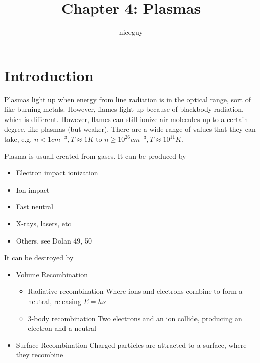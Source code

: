 \documentclass[12pt]{article}
\title{Chapter 4: Plasmas}
\author{niceguy}
\begin{document}
\maketitle

\section{Introduction}

Plasmas light up when energy from line radiation is in the optical range, sort of like burning metals. However, flames light up because of blackbody radiation, which is different. However, flames can still ionize air molecules up to a certain degree, like plasmas (but weaker). There are a wide range of values that they can take, e.g. $n < 1\unit{cm^{-3}}, T \approx 1\unit{K}$ to $n \geq 10^{26}\unit{cm^{-3}}, T \approx 10^{11}\unit{K}$.

Plasma is usuall created from gases. It can be produced by

\begin{itemize}
    \item Electron impact ionization
    \item Ion impact
    \item Fast neutral
    \item X-rays, lasers, etc
    \item Others, see Dolan 49, 50
\end{itemize}

It can be destroyed by

\begin{itemize}
    \item Volume Recombination
        \begin{itemize}
            \item Radiative recombination
                Where ions and electrons combine to form a neutral, releasing $E = h\nu$
            \item 3-body recombination
                Two electrons and an ion collide, producing an electron and a neutral
        \end{itemize}
    \item Surface Recombination
        Charged particles are attracted to a surface, where they recombine
\end{itemize}
                
\end{document}
